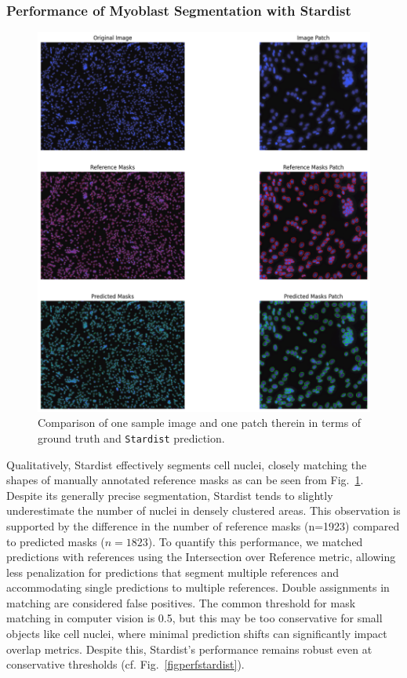 \subsubsection{Performance of Myoblast Segmentation with Stardist}

\begin{figure}
	\centering
	\includegraphics[width=\textwidth]{"images/qualitative_performance_stardist.png"}
	\caption[Qualitative performance \texttt{Stardist}]{Comparison of one sample image and one patch therein in terms of ground truth and \texttt{Stardist} prediction.}
	\label{figperfstardistqual}
\end{figure} 

Qualitatively, Stardist effectively segments cell nuclei, closely matching the shapes of manually annotated reference masks as can be seen from Fig.~\ref{figperfstardistqual}. Despite its generally precise segmentation, Stardist tends to slightly underestimate the number of nuclei in densely clustered areas. This observation is supported by the difference in the number of reference masks (n=1923) compared to predicted masks ($n=1823$). To quantify this performance, we matched predictions with references using the Intersection over Reference metric, allowing less penalization for predictions that segment multiple references and accommodating single predictions to multiple references. Double assignments in matching are considered false positives.
The common threshold for mask matching in computer vision is 0.5, but this may be too conservative for small objects like cell nuclei, where minimal prediction shifts can significantly impact overlap metrics. Despite this, Stardist's performance remains robust even at conservative thresholds (cf. Fig.~\ref{figperfstardist}).


